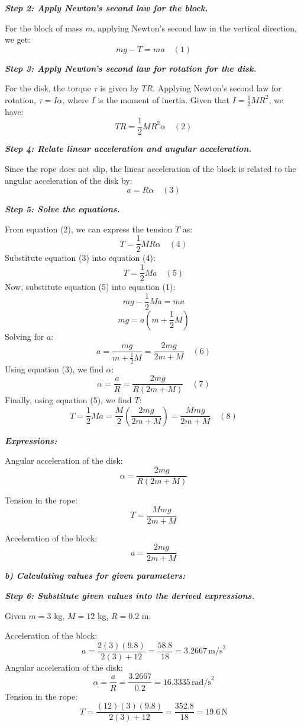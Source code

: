 \documentclass{article}
\begin{document}
\textit{\textbf{Step 2: Apply Newton's second law for the block.}}

For the block of mass $m$, applying Newton's second law in the vertical direction, we get:
$$mg - T = ma \quad (1)$$

\textit{\textbf{Step 3: Apply Newton's second law for rotation for the disk.}}

For the disk, the torque $\tau$ is given by $TR$. Applying Newton's second law for rotation, $\tau = I\alpha$, where $I$ is the moment of inertia. Given that \(I=\frac{1}{2}MR^{2}\), we have:
$$TR = \frac{1}{2}MR^{2}\alpha \quad (2)$$

\textit{\textbf{Step 4: Relate linear acceleration and angular acceleration.}}

Since the rope does not slip, the linear acceleration of the block is related to the angular acceleration of the disk by:
$$a = R\alpha \quad (3)$$

\textit{\textbf{Step 5: Solve the equations.}}

From equation (2), we can express the tension $T$ as:
$$T = \frac{1}{2}MR\alpha \quad (4)$$
Substitute equation (3) into equation (4):
$$T = \frac{1}{2}Ma \quad (5)$$
Now, substitute equation (5) into equation (1):
$$mg - \frac{1}{2}Ma = ma$$
$$mg = a(m + \frac{1}{2}M)$$
Solving for $a$:
$$a = \frac{mg}{m + \frac{1}{2}M} = \frac{2mg}{2m+M} \quad (6)$$
Using equation (3), we find $\alpha$:
$$\alpha = \frac{a}{R} = \frac{2mg}{R(2m+M)} \quad (7)$$
Finally, using equation (5), we find $T$:
$$T = \frac{1}{2}Ma = \frac{M}{2}\left(\frac{2mg}{2m+M}\right) = \frac{Mmg}{2m+M} \quad (8)$$

\textit{\textbf{Expressions:}}

Angular acceleration of the disk:
$$\alpha = \frac{2mg}{R(2m+M)}$$

Tension in the rope:
$$T = \frac{Mmg}{2m+M}$$

Acceleration of the block:
$$a = \frac{2mg}{2m+M}$$

\textit{\textbf{b) Calculating values for given parameters:}}

\textit{\textbf{Step 6: Substitute given values into the derived expressions.}}

Given \(m=3\) kg, \(M=12\) kg, \(R=0.2\) m.

Acceleration of the block:
$$a = \frac{2(3)(9.8)}{2(3)+12} = \frac{58.8}{18} = 3.2667 \, \text{m/s}^2$$
Angular acceleration of the disk:
$$\alpha = \frac{a}{R} = \frac{3.2667}{0.2} = 16.3335 \, \text{rad/s}^2$$
Tension in the rope:
$$T = \frac{(12)(3)(9.8)}{2(3)+12} = \frac{352.8}{18} = 19.6 \, \text{N}$$
\end{document}
